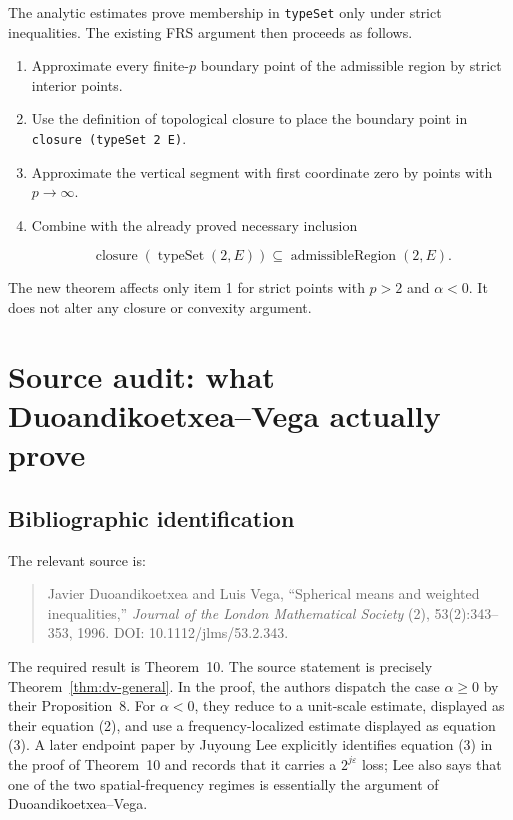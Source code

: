 \documentclass[11pt,a4paper]{article}
\theoremstyle{definition}
\theoremstyle{remark}
\newcommand{\lean}{\texttt}
\begin{document}
The analytic estimates prove membership in \lean{typeSet} only under strict
inequalities.  The existing FRS argument then proceeds as follows.

\begin{enumerate}[leftmargin=8mm]
\item Approximate every finite-$p$ boundary point of the admissible region by
      strict interior points.
\item Use the definition of topological closure to place the boundary point in
      \lean{closure (typeSet 2 E)}.
\item Approximate the vertical segment with first coordinate zero by points
      with $p\to\infty$.
\item Combine with the already proved necessary inclusion

\[
\operatorname{closure}(\operatorname{typeSet}(2,E))
\subseteq
\operatorname{admissibleRegion}(2,E).
\]
\end{enumerate}

The new theorem affects only item 1 for strict points with $p>2$ and
$\alpha<0$.  It does not alter any closure or convexity argument.

\section{Source audit: what Duoandikoetxea--Vega actually prove}

\subsection{Bibliographic identification}

The relevant source is:

\begin{quote}
Javier Duoandikoetxea and Luis Vega, ``Spherical means and weighted
inequalities,'' \emph{Journal of the London Mathematical Society} (2),
53(2):343--353, 1996.  DOI: 10.1112/jlms/53.2.343.
\end{quote}

The required result is Theorem~10.  The source statement is precisely
Theorem~\ref{thm:dv-general}.  In the proof, the authors dispatch the case
$\alpha\geq0$ by their Proposition~8.  For $\alpha<0$, they reduce to a
unit-scale estimate, displayed as their equation (2), and use a
frequency-localized estimate displayed as equation (3).  A later endpoint
paper by Juyoung Lee explicitly identifies equation (3) in the proof of
Theorem~10 and records that it carries a $2^{j\varepsilon}$ loss; Lee also says
that one of the two spatial-frequency regimes is essentially the argument of
Duoandikoetxea--Vega.
\end{document}
